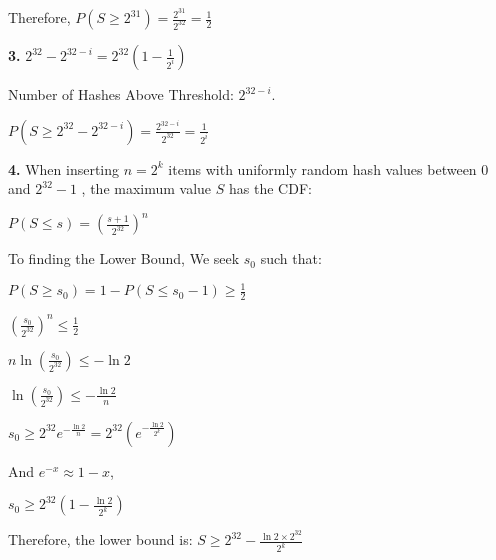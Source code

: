 \documentclass[11pt]{exam}
\begin{document}
Therefore, $P(S \geq 2^{31}) = \frac{2^{31}}{2^{32}} = \frac{1}{2}$

\noindent\textbf{3.}
$2^{32} - 2^{32 - i} = 2^{32} \left( 1 - \frac{1}{2^i} \right)$

Number of Hashes Above Threshold:  $2^{32 - i}$.

$P\left( S \geq 2^{32} - 2^{32 - i} \right) = \frac{2^{32 - i}}{2^{32}} = \frac{1}{2^i}$

\noindent\textbf{4.}
When inserting $n = 2^k$ items with uniformly random hash values between  0  and  $2^{32} - 1$ , the maximum value $S$ has the CDF:

$P(S \leq s) = \left( \frac{s + 1}{2^{32}} \right)^{n}$

To finding the Lower Bound, We seek $s_0$  such that:

$P(S \geq s_0) = 1 - P(S \leq s_0 - 1) \geq \frac{1}{2}$

$\left( \frac{s_0}{2^{32}} \right)^{n} \leq \frac{1}{2}$

$n \ln\left( \frac{s_0}{2^{32}} \right) \leq -\ln 2$

$\ln\left( \frac{s_0}{2^{32}} \right) \leq -\frac{\ln 2}{n}$


$s_0 \geq 2^{32} e^{- \frac{\ln 2}{n}} = 2^{32} \left( e^{- \frac{\ln 2}{2^k}} \right)$

And  $e^{-x} \approx 1 - x$,

$s_0 \geq 2^{32} \left( 1 - \frac{\ln 2}{2^k} \right)$

Therefore, the lower bound is:
$S \geq 2^{32} - \frac{\ln 2 \times 2^{32}}{2^k}$
\end{document}
